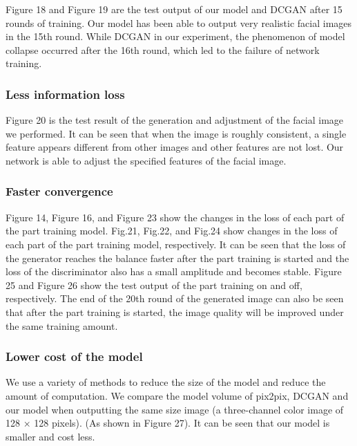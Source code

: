 Figure 18 and Figure 19 are the test output of our model and DCGAN after 15 rounds of training.
Our model has been able to output very realistic facial images in the 15th round.
While DCGAN in our experiment, the phenomenon of model collapse occurred after the 16th round, which led to the failure of network training.

\subsubsection*{Less information loss}
Figure 20 is the test result of the generation and adjustment of the facial image we performed.
It can be seen that when the image is roughly consistent, a single feature appears different from other images and other features are not lost.
Our network is able to adjust the specified features of the facial image.

\subsubsection*{Faster convergence}
Figure 14, Figure 16, and Figure 23 show the changes in the loss of each part of the part training model.
Fig.21, Fig.22, and Fig.24 show changes in the loss of each part of the part training model, respectively.
It can be seen that the loss of the generator reaches the balance faster after the part training is started and the loss of the discriminator also has a small amplitude and becomes stable.
Figure 25 and Figure 26 show the test output of the part training on and off, respectively.
The end of the 20th round of the generated image can also be seen that after the part training is started, the image quality will be improved under the same training amount.

\subsubsection*{Lower cost of the model}
We use a variety of methods to reduce the size of the model and reduce the amount of computation.
We compare the model volume of pix2pix, DCGAN and our model when outputting the same size image (a three-channel color image of 128 × 128 pixels).
(As shown in Figure 27).
It can be seen that our model is smaller and cost less.